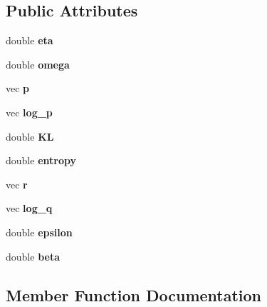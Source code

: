\subsection*{Public Attributes}
\begin{DoxyCompactItemize}
\item 
double {\bfseries eta}\hypertarget{classReps_a1aac4e6701eb06aacec76ee2077ae515}{}\label{classReps_a1aac4e6701eb06aacec76ee2077ae515}

\item 
double {\bfseries omega}\hypertarget{classReps_affc7af1c709413fefe17419cf71b7aa9}{}\label{classReps_affc7af1c709413fefe17419cf71b7aa9}

\item 
vec {\bfseries p}\hypertarget{classReps_a266220cc4fd9f1c6ae6b6749f5b36a04}{}\label{classReps_a266220cc4fd9f1c6ae6b6749f5b36a04}

\item 
vec {\bfseries log\+\_\+p}\hypertarget{classReps_a50c7ba898cb3f88308223cbffbe5ac54}{}\label{classReps_a50c7ba898cb3f88308223cbffbe5ac54}

\item 
double {\bfseries KL}\hypertarget{classReps_a881c2659f75268ad6956b1780b9c4e53}{}\label{classReps_a881c2659f75268ad6956b1780b9c4e53}

\item 
double {\bfseries entropy}\hypertarget{classReps_a2b2c565ef3a60ce1ef8c72df54281d09}{}\label{classReps_a2b2c565ef3a60ce1ef8c72df54281d09}

\item 
vec {\bfseries r}\hypertarget{classReps_a31e8cb7f83a0ecc997110edac84af200}{}\label{classReps_a31e8cb7f83a0ecc997110edac84af200}

\item 
vec {\bfseries log\+\_\+q}\hypertarget{classReps_aa2f96dd7c0672fa78dc7d63f3a40a046}{}\label{classReps_aa2f96dd7c0672fa78dc7d63f3a40a046}

\item 
double {\bfseries epsilon}\hypertarget{classReps_a155d1a27194ad4976dcbaa6476f9f768}{}\label{classReps_a155d1a27194ad4976dcbaa6476f9f768}

\item 
double {\bfseries beta}\hypertarget{classReps_a4e56c3517fef0956183d46a467d007df}{}\label{classReps_a4e56c3517fef0956183d46a467d007df}

\end{DoxyCompactItemize}


\subsection{Member Function Documentation}
